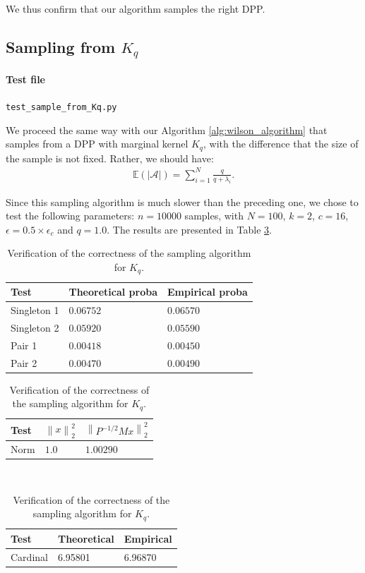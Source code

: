 \documentclass{article}
\newcommand{\abs} [1] {\left| #1 \right|}
\newcommand{\norm}[1]{\left\|#1\right\|}
\begin{document}
We thus confirm that our algorithm samples the right DPP.


\subsection[Sampling from Kq]{Sampling from $K_q$}


\paragraph{Test file} \verb#test_sample_from_Kq.py#


We proceed the same way with our Algorithm \ref{alg:wilson_algorithm} that samples from a DPP with marginal kernel $K_q$, with the difference that the size of the sample is not fixed. Rather, we should have:
\begin{align} \mathbb{E}\left( \abs{\mathcal{A}}\right) = \sum_{i=1}^{N} \frac{q}{q+\lambda_i}. \end{align}


Since this sampling algorithm is much slower than the preceding one, we chose to test the following parameters: $n=10000$ samples, with $N=100$, $k=2$, $c=16$, $\epsilon = 0.5 \times \epsilon_c$ and $q=1.0$. The results are presented in Table \ref{tab:Kq:verification}.

\begin{table}[th]
  \caption{Verification of the correctness of the sampling algorithm for $K_q$.}
  \label{tab:Kq:verification}
  \centering
  \begin{tabular}{lll}
    \toprule
    Test &  Theoretical proba & Empirical proba \\
    \midrule
    Singleton 1 & $0.06752$ & $0.06570$ \\
    Singleton 2 & $0.05920$ & $0.05590$ \\
    Pair 1 & $0.00418$ & $0.00450$ \\
		Pair 2 & $0.00470$ & $0.00490$ \\
    \bottomrule
  \end{tabular}
	\quad
	\begin{tabular}{lll}
    \toprule
    Test &  $\norm{x}_2^2$ & $\norm{P^{-1/2} M x}_2^2$ \\
    \midrule
    Norm & $1.0$ & $1.00290$ \\
    \bottomrule
  \end{tabular} \\
	\vspace{0.5cm}
	\begin{tabular}{lll}
    \toprule
    Test &  Theoretical & Empirical \\
    \midrule
    Cardinal & 6.95801 & 6.96870 \\
    \bottomrule
  \end{tabular}
\end{table}
		
\end{document}
